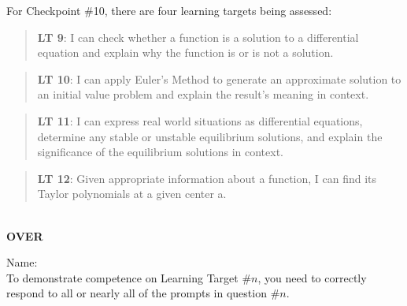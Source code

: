 \documentclass[11 pt]{article}
\begin{document}
 For Checkpoint \#10, there are four learning targets being assessed: 

\begin{quote}
{\bf LT 9}: I can check whether a function is a solution to a differential equation and explain why the function is or is not a solution.
\end{quote}

\begin{quote}
{\bf LT 10}:  I can apply Euler’s Method to generate an approximate solution to an initial value problem and explain the result’s meaning in context.
\end{quote}

\begin{quote}
{\bf LT 11}:  I can express real world situations as differential equations, determine any stable or unstable equilibrium solutions, and explain the significance of the equilibrium solutions in context.
\end{quote}

\begin{quote}
{\bf LT 12}:  Given appropriate information about a function, I can find its Taylor polynomials at a given center a.
\end{quote}

\noindent \hrulefill \\

\vfill \hfill {\bf OVER} 

\pagebreak

\noindent Name: \\ 

\noindent To demonstrate competence on Learning Target \#$n$, you need to correctly respond to all or nearly all of the prompts in question \#$n$.  
\end{document}
